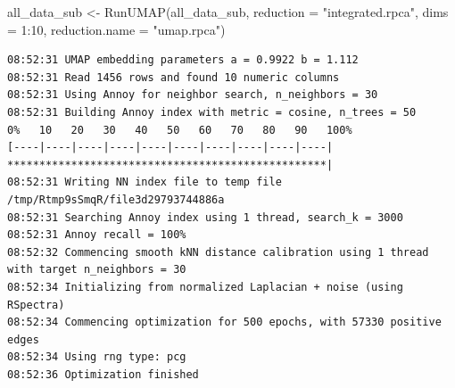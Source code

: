 \documentclass[
  letterpaper,
  DIV=11,
  numbers=noendperiod]{scrreprt}
\newenvironment{Shaded}{\begin{snugshade}}{\end{snugshade}}
\newcommand{\AttributeTok}[1]{\textcolor[rgb]{0.40,0.45,0.13}{#1}}
\newcommand{\DecValTok}[1]{\textcolor[rgb]{0.68,0.00,0.00}{#1}}
\newcommand{\FunctionTok}[1]{\textcolor[rgb]{0.28,0.35,0.67}{#1}}
\newcommand{\NormalTok}[1]{\textcolor[rgb]{0.00,0.23,0.31}{#1}}
\newcommand{\OtherTok}[1]{\textcolor[rgb]{0.00,0.23,0.31}{#1}}
\newcommand{\SpecialCharTok}[1]{\textcolor[rgb]{0.37,0.37,0.37}{#1}}
\newcommand{\StringTok}[1]{\textcolor[rgb]{0.13,0.47,0.30}{#1}}
\begin{document}
\begin{Shaded}
\begin{Highlighting}[]
\NormalTok{all\_data\_sub }\OtherTok{\textless{}{-}} \FunctionTok{RunUMAP}\NormalTok{(all\_data\_sub, }\AttributeTok{reduction =} \StringTok{"integrated.rpca"}\NormalTok{, }\AttributeTok{dims =} \DecValTok{1}\SpecialCharTok{:}\DecValTok{10}\NormalTok{, }\AttributeTok{reduction.name =} \StringTok{"umap.rpca"}\NormalTok{)}
\end{Highlighting}
\end{Shaded}

\begin{verbatim}
08:52:31 UMAP embedding parameters a = 0.9922 b = 1.112
08:52:31 Read 1456 rows and found 10 numeric columns
08:52:31 Using Annoy for neighbor search, n_neighbors = 30
08:52:31 Building Annoy index with metric = cosine, n_trees = 50
0%   10   20   30   40   50   60   70   80   90   100%
[----|----|----|----|----|----|----|----|----|----|
**************************************************|
08:52:31 Writing NN index file to temp file /tmp/Rtmp9sSmqR/file3d29793744886a
08:52:31 Searching Annoy index using 1 thread, search_k = 3000
08:52:31 Annoy recall = 100%
08:52:32 Commencing smooth kNN distance calibration using 1 thread with target n_neighbors = 30
08:52:34 Initializing from normalized Laplacian + noise (using RSpectra)
08:52:34 Commencing optimization for 500 epochs, with 57330 positive edges
08:52:34 Using rng type: pcg
08:52:36 Optimization finished
\end{verbatim}
\end{document}
